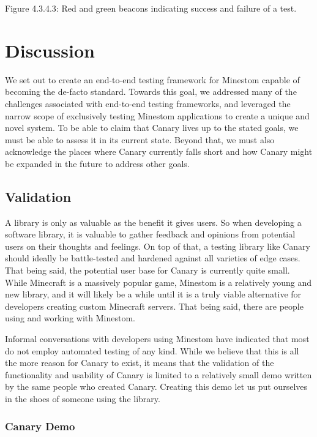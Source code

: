 \documentclass{article}
\begin{document}
\begin{onehalfspacing}
Figure 4.3.4.3: Red and green beacons indicating success and failure of
a test.

\section{Discussion}

We set out to create an end-to-end testing framework for Minestom
capable of becoming the de-facto standard. Towards this goal, we
addressed many of the challenges associated with end-to-end testing
frameworks, and leveraged the narrow scope of exclusively testing
Minestom applications to create a unique and novel system. To be able to
claim that Canary lives up to the stated goals, we must be able to
assess it in its current state. Beyond that, we must also acknowledge
the places where Canary currently falls short and how Canary might be
expanded in the future to address other goals.

\subsection{Validation}

A library is only as valuable as the benefit it gives users. So when
developing a software library, it is valuable to gather feedback and
opinions from potential users on their thoughts and feelings. On top of
that, a testing library like Canary should ideally be battle-tested and
hardened against all varieties of edge cases. That being said, the
potential user base for Canary is currently quite small. While Minecraft
is a massively popular game, Minestom is a relatively young and new
library, and it will likely be a while until it is a truly viable
alternative for developers creating custom Minecraft servers. That being
said, there are people using and working with Minestom.

Informal conversations with developers using Minestom have indicated
that most do not employ automated testing of any kind. While we believe
that this is all the more reason for Canary to exist, it means that the
validation of the functionality and usability of Canary is limited to a
relatively small demo written by the same people who created Canary.
Creating this demo let us put ourselves in the shoes of someone using
the library.

\subsubsection{Canary Demo}


\end{onehalfspacing}
\end{document}
